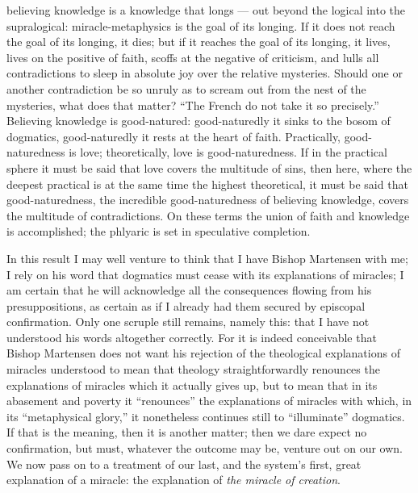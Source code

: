 \documentclass[12pt]{book}
\newcommand{\opage}[1]{\marginnote{\footnotesize\textit{[#1]}}}
\begin{document}
\opage{95}\setcounter{footnote}{0}%
believing knowledge is a knowledge that longs --- out beyond the logical into the supralogical: miracle-metaphysics is the goal of its longing. If it does not reach the goal of its longing, it dies; but if it reaches the goal of its longing, it lives, lives on the positive of faith, scoffs at the negative of criticism, and lulls all contradictions to sleep in absolute joy over the relative mysteries. Should one or another contradiction be so unruly as to scream out from the nest of the mysteries, what does that matter? ``The French do not take it so precisely.'' Believing knowledge is good-natured: good-naturedly it sinks to the bosom of dogmatics, good-naturedly it rests at the heart of faith. Practically, good-naturedness is love; theoretically, love is good-naturedness. If in the practical sphere it must be said that love covers the multitude of sins, then here, where the deepest practical is at the same time the highest theoretical, it must be said that good-naturedness, the incredible good-naturedness of believing knowledge, covers the multitude of contradictions. On these terms the union of faith and knowledge is accomplished; the phlyaric is set in speculative completion.

In this result I may well venture to think that I have Bishop Martensen with me; I rely on his word that dogmatics must cease with its explanations of miracles; I am certain that he will acknowledge all the consequences flowing from his presuppositions, as certain as if I already had them secured by episcopal confirmation. Only one scruple still remains, namely this: that I have not understood his words altogether correctly. For it is indeed conceivable that Bishop Martensen does not want his rejection of the theological explanations of miracles understood to mean that theology straightforwardly renounces the explanations of miracles which it actually gives up, but to mean that in its abasement and poverty it ``renounces'' the explanations of miracles with which, in its ``metaphysical glory,'' it nonetheless continues still to ``illuminate'' dogmatics. If that is the meaning, then it is another matter; then
\opage{96}\setcounter{footnote}{0}%
we dare expect no confirmation, but must, whatever the outcome may be, venture out on our own. We now pass on to a treatment of our last, and the system's first, great explanation of a miracle: the explanation of \emph{the miracle of creation}.
\end{document}
